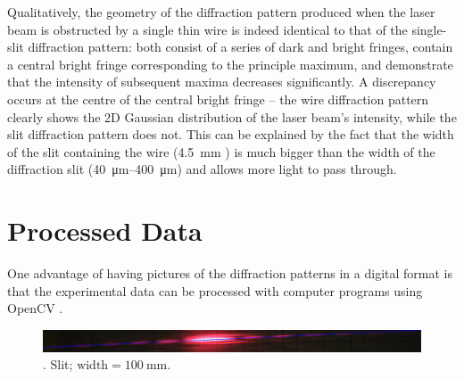 \documentclass[a4paper, 12pt]{article}
\begin{document}
Qualitatively, the geometry of the diffraction pattern produced when the laser beam is obstructed by a single thin wire is indeed identical to that of the single-slit diffraction pattern: both consist of a series of dark and bright fringes, contain a central bright fringe corresponding to the principle maximum, and demonstrate that the intensity of subsequent maxima decreases significantly. A discrepancy occurs at the centre of the central bright fringe -- the wire diffraction pattern clearly shows the 2D Gaussian distribution of the laser beam's intensity, while the slit diffraction pattern does not. This can be explained by the fact that the width of the slit containing the wire (\SI{4.5}{\mm} \cite{wire_measurement}) is much bigger than the width of the diffraction slit (\SI{40}{\um}--\SI{400}{\um}) and allows more light to pass through.


\section*{Processed Data}
One advantage of having pictures of the diffraction patterns in a digital format is that the experimental data can be processed with computer programs using OpenCV \cite{opencv_library}.

\begin{figure}[H]
    \includegraphics[width=\textwidth]{scripts/processed-data/axis}
    \caption{ . Slit; $\text{width} = \SI{100}{\mm}$. }
    \label{fig:mains-axis}
\end{figure}
\end{document}
